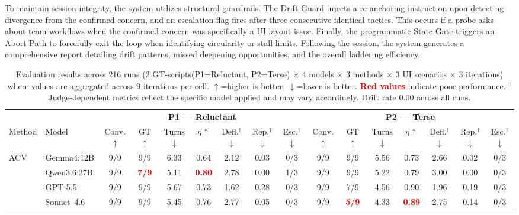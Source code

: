 \documentclass[sigconf,authordraft]{acmart}
\newcommand{\bad}[1]{\textcolor{red}{\textbf{#1}}}
\begin{document}
To maintain session integrity, the system utilizes structural guardrails. The Drift Guard injects a re-anchoring instruction upon detecting divergence from the confirmed concern, and an escalation flag fires after three consecutive identical tactics. This occurs if a probe asks about team workflows when the confirmed concern was specifically a UI layout issue. Finally, the programmatic State Gate triggers an Abort Path to forcefully exit the loop when identifying circularity or stall limits. Following the session, the system generates a comprehensive report detailing drift patterns, missed deepening opportunities, and the overall laddering efficiency.

\begin{table}[t]
\caption{Evaluation results across 216 runs (2 GT-scripts(P1=Reluctant, P2=Terse) $\times$ 4 models $\times$ 3 methods $\times$ 3 UI scenarios $\times$ 3 iterations) where values are aggregated across 9 iterations per cell. $\uparrow$=higher is better; $\downarrow$=lower is better. \textcolor{red}{\textbf{Red values}} indicate poor performance. $^\dagger$Judge-dependent metrics reflect the specific model applied and may vary accordingly. Drift rate 0.00 across all runs.}
\label{tab:results}
\scriptsize
\begin{tabular*}{\textwidth}{@{\extracolsep{\fill}}ll ccccccc ccccccc}
\toprule
& & \multicolumn{7}{c}{\textbf{P1 — Reluctant}} & \multicolumn{7}{c}{\textbf{P2 — Terse}} \\
\cmidrule(lr){3-9}\cmidrule(lr){10-16}
Method & Model
  & Conv.$\uparrow$ & GT$\uparrow$ & Turns$\downarrow$ & $\eta$$\uparrow$ & Defl.$^\dagger$$\downarrow$ & Rep.$^\dagger$$\downarrow$ & Esc.$^\dagger$$\downarrow$
  & Conv.$\uparrow$ & GT$\uparrow$ & Turns$\downarrow$ & $\eta$$\uparrow$ & Defl.$^\dagger$$\downarrow$ & Rep.$^\dagger$$\downarrow$ & Esc.$^\dagger$$\downarrow$ \\
\midrule
\multirow{4}{*}{ACV}
 & Gemma4:12B     & 9/9 & 9/9          & 6.33 & 0.64 & 2.12 & 0.03 & 0/3
              & 9/9 & 9/9          & 5.56 & 0.73 & 2.66 & 0.02 & 0/3 \\
 & Qwen3.6:27B    & 9/9 & \bad{7/9}  & 5.11 & \bad{0.80} & 2.78 & 0.00 & 1/3
              & 9/9 & 9/9          & 5.22 & 0.79 & 3.00 & 0.00 & 0/3 \\
 & GPT-5.5    & 9/9 & 9/9          & 5.67 & 0.73 & 1.62 & 0.28 & 0/3
              & 9/9 & 7/9          & 4.56 & 0.90 & 1.96 & 0.19 & 0/3 \\
 & Sonnet~4.6 & 9/9 & 9/9          & 5.45 & 0.76 & 2.77 & 0.05 & 0/3
              & 9/9 & \bad{5/9}  & 4.33 & \bad{0.89} & 2.75 & 0.14 & 0/3 \\

\end{tabular*}
\end{table}
\end{document}
